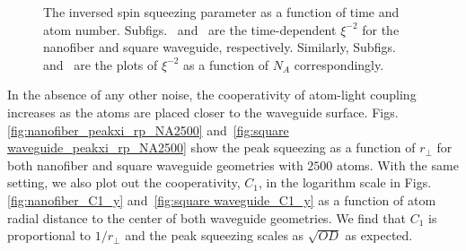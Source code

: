 \documentclass[preprint,aps,pra,onecolumn,superscriptaddress]{revtex4-1} %
\begin{document}
\begin{figure}[htb]
\centering
 \begin{minipage}[h]{0.95\linewidth}
    \hfill
   \end{minipage}\vfill
   \begin{minipage}[h]{0.95\linewidth}
       \hfill
   \end{minipage}
\caption{The inversed spin squeezing parameter as a function of time and atom number. Subfigs.~\protect{} and~\protect{} are the time-dependent $ \xi^{-2} $ for the nanofiber and square waveguide, respectively. Similarly, Subfigs.~\protect{} and~\protect{} are the plots of $ \xi^{-2} $ as a function of $ N_A $ correspondingly. }\label{fig:xi_rpfix_NA_t}
\end{figure}

{\color{red} In the absence of any other noise, the cooperativity of atom-light coupling increases as the atoms are placed closer to the waveguide surface. Figs.\ref{fig:nanofiber_peakxi_rp_NA2500} and~\ref{fig:square waveguide_peakxi_rp_NA2500} show the peak squeezing  as a function of $ r\!_\perp $ for both nanofiber and square waveguide geometries with $2500$ atoms. With the same setting, we also plot out the cooperativity, $ C_1 $, in the logarithm scale in Figs.\ref{fig:nanofiber_C1_y} and~\ref{fig:square waveguide_C1_y} as a function of atom radial distance to the center of both waveguide geometries. We find that $C_1$ is proportional to $ 1/r\!_\perp $ and the peak squeezing scales as $ \sqrt{OD} $ as expected. }
\end{document}
